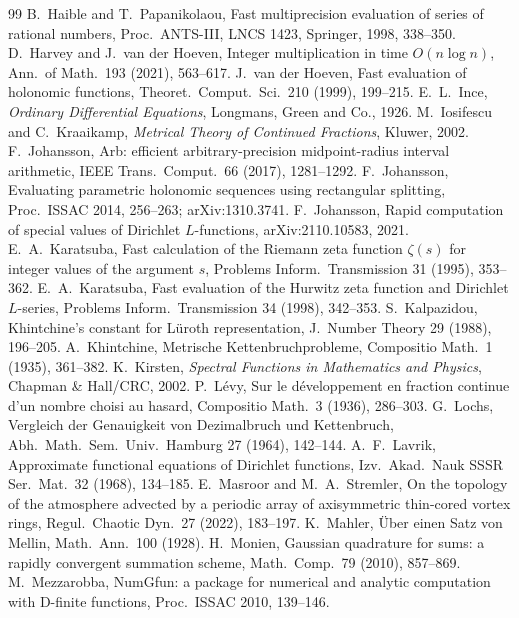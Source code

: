 \documentclass[11pt,reqno]{amsart}
\theoremstyle{definition}
\theoremstyle{remark}
\begin{document}
\begin{thebibliography}{99}
 B.~Haible and T.~Papanikolaou, Fast multiprecision evaluation of series of rational numbers, Proc.\ ANTS-III, LNCS 1423, Springer, 1998, 338--350.
 D.~Harvey and J.~van der Hoeven, Integer multiplication in time $O(n\log n)$, Ann.\ of Math.\ 193 (2021), 563--617.
 J.~van der Hoeven, Fast evaluation of holonomic functions, Theoret.\ Comput.\ Sci.\ 210 (1999), 199--215.
 E.~L.~Ince, \emph{Ordinary Differential Equations}, Longmans, Green and Co., 1926.
 M.~Iosifescu and C.~Kraaikamp, \emph{Metrical Theory of Continued Fractions}, Kluwer, 2002.
 F.~Johansson, Arb: efficient arbitrary-precision midpoint-radius interval arithmetic, IEEE Trans.\ Comput.\ 66 (2017), 1281--1292.
 F.~Johansson, Evaluating parametric holonomic sequences using rectangular splitting, Proc.\ ISSAC 2014, 256--263; arXiv:1310.3741.
 F.~Johansson, Rapid computation of special values of Dirichlet $L$-functions, arXiv:2110.10583, 2021.
 E.~A.~Karatsuba, Fast calculation of the Riemann zeta function $\zeta(s)$ for integer values of the argument $s$, Problems Inform.\ Transmission 31 (1995), 353--362.
 E.~A.~Karatsuba, Fast evaluation of the Hurwitz zeta function and Dirichlet $L$-series, Problems Inform.\ Transmission 34 (1998), 342--353.
 S.~Kalpazidou, Khintchine's constant for L\"uroth representation, J.\ Number Theory 29 (1988), 196--205.
 A.~Khintchine, Metrische Kettenbruchprobleme, Compositio Math.\ 1 (1935), 361--382.
 K.~Kirsten, \emph{Spectral Functions in Mathematics and Physics}, Chapman \& Hall/CRC, 2002.
 P.~L\'evy, Sur le d\'eveloppement en fraction continue d'un nombre choisi au hasard, Compositio
Math.\ 3 (1936), 286--303.
 G.~Lochs, Vergleich der Genauigkeit von Dezimalbruch und Kettenbruch, Abh.\ Math.\ Sem.\ Univ.\
Hamburg 27 (1964), 142--144.
 A.~F.~Lavrik, Approximate functional equations of Dirichlet functions, Izv.\ Akad.\ Nauk SSSR Ser.\ Mat.\ 32 (1968), 134--185.
\bibitem{MS22} E.~Masroor and M.~A.~Stremler, On the topology of the atmosphere advected by a periodic array of axisymmetric thin-cored vortex rings, Regul.\ Chaotic Dyn.\ 27 (2022), 183--197.
\bibitem{Mah28} K.~Mahler, \"Uber einen Satz von Mellin, Math.\ Ann.\ 100 (1928).
\bibitem{Mon10} H.~Monien, Gaussian quadrature for sums: a rapidly convergent summation scheme, Math.\ Comp.\ 79 (2010), 857--869.
\bibitem{Mez10} M.~Mezzarobba, NumGfun: a package for numerical and analytic computation with D-finite functions, Proc.\ ISSAC 2010, 139--146.

\end{thebibliography}
\end{document}
